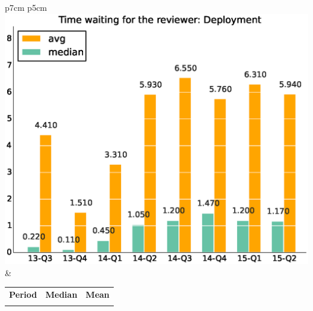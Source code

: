 \documentclass[a4wide,11pt]{article}
\begin{document}
\begin{tabular}{p{7cm} p{5cm}}
    \vspace{0pt} 
    \includegraphics[scale=.35]{figs/waiting4reviewer_avgDeployment.eps}
    & 
    \vspace{0pt}
    \begin{tabular}{l|r|r|}%
    \bfseries Period & \bfseries Median & \bfseries Mean %
    \csvreader[head to column names]{data/timewaiting4reviewer_medianDeployment.csv}{}%
    {\\ & \mediantime & \meantime}
    \end{tabular}
\end{tabular}
\end{document}
